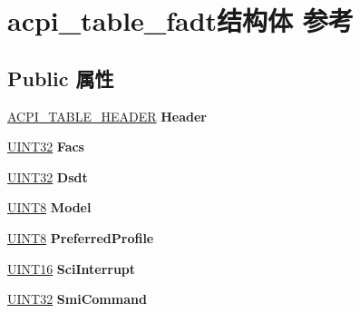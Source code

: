 \hypertarget{structacpi__table__fadt}{}\section{acpi\+\_\+table\+\_\+fadt结构体 参考}
\label{structacpi__table__fadt}
\subsection*{Public 属性}
\begin{DoxyCompactItemize}
\item 
\mbox{\label{structacpi__table__fadt_aa66b711bf32700115522827ff4eadeeb}} 
\hyperlink{structacpi__table__header}{A\+C\+P\+I\+\_\+\+T\+A\+B\+L\+E\+\_\+\+H\+E\+A\+D\+ER} {\bfseries Header}
\item 
\mbox{\label{structacpi__table__fadt_a7519cb1099358e893808975cc6630069}} 
\hyperlink{_processor_bind_8h_ae1e6edbbc26d6fbc71a90190d0266018}{U\+I\+N\+T32} {\bfseries Facs}
\item 
\mbox{\label{structacpi__table__fadt_ab04d56f90b9d4a8f971c03a6a064de12}} 
\hyperlink{_processor_bind_8h_ae1e6edbbc26d6fbc71a90190d0266018}{U\+I\+N\+T32} {\bfseries Dsdt}
\item 
\mbox{\label{structacpi__table__fadt_a90fd2394f1f440ab885748b235cdcba7}} 
\hyperlink{_processor_bind_8h_ab27e9918b538ce9d8ca692479b375b6a}{U\+I\+N\+T8} {\bfseries Model}
\item 
\mbox{\label{structacpi__table__fadt_ad2f724e293ca6da1a2662be3387da306}} 
\hyperlink{_processor_bind_8h_ab27e9918b538ce9d8ca692479b375b6a}{U\+I\+N\+T8} {\bfseries Preferred\+Profile}
\item 
\mbox{\label{structacpi__table__fadt_a49ca9e042b0227a8e50b5ed1e310b6f2}} 
\hyperlink{_processor_bind_8h_a09f1a1fb2293e33483cc8d44aefb1eb1}{U\+I\+N\+T16} {\bfseries Sci\+Interrupt}
\item 
\mbox{\label{structacpi__table__fadt_a21dfe2a047bb99e384189f19b7b34185}} 
\hyperlink{_processor_bind_8h_ae1e6edbbc26d6fbc71a90190d0266018}{U\+I\+N\+T32} {\bfseries Smi\+Command}

\end{DoxyCompactItemize}
